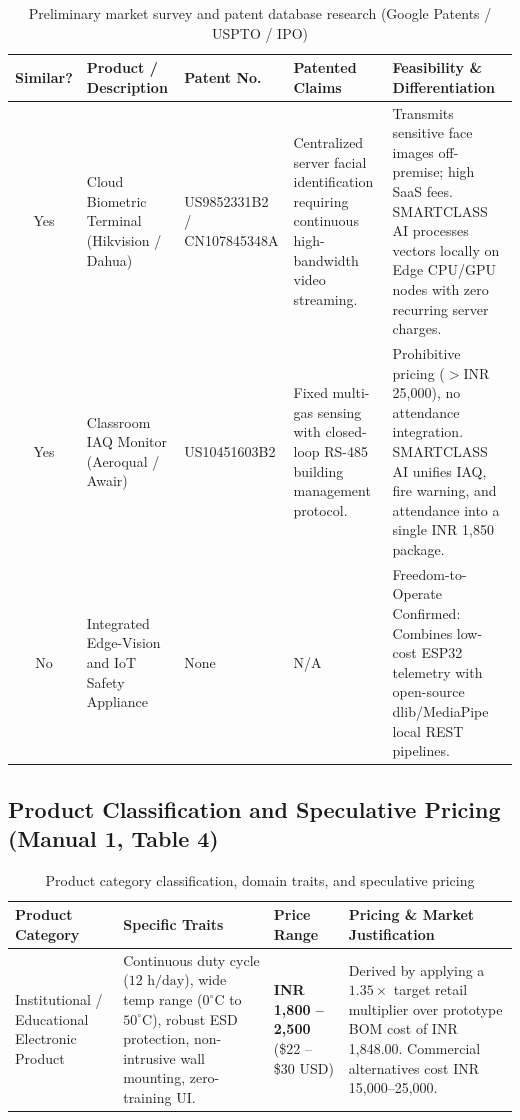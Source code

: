 \documentclass[11pt,a4paper]{article}
\begin{document}
\begin{table}[h!]
\centering
\caption{Preliminary market survey and patent database research (Google Patents / USPTO / IPO)}
\begin{tabular}{|c|p{3.5cm}|p{2.8cm}|p{3.8cm}|p{4.2cm}|}
\hline
\textbf{Similar?} & \textbf{Product / Description} & \textbf{Patent No.} & \textbf{Patented Claims} & \textbf{Feasibility \& Differentiation} \\ \hline
Yes & Cloud Biometric Terminal (Hikvision / Dahua) & US9852331B2 / CN107845348A & Centralized server facial identification requiring continuous high-bandwidth video streaming. & Transmits sensitive face images off-premise; high SaaS fees. SMARTCLASS AI processes vectors locally on Edge CPU/GPU nodes with zero recurring server charges. \\ \hline
Yes & Classroom IAQ Monitor (Aeroqual / Awair) & US10451603B2 & Fixed multi-gas sensing with closed-loop RS-485 building management protocol. & Prohibitive pricing ($>$INR 25,000), no attendance integration. SMARTCLASS AI unifies IAQ, fire warning, and attendance into a single INR 1,850 package. \\ \hline
No & Integrated Edge-Vision and IoT Safety Appliance & None & N/A & Freedom-to-Operate Confirmed: Combines low-cost ESP32 telemetry with open-source dlib/MediaPipe local REST pipelines. \\ \hline
\end{tabular}
\end{table}

\subsection{Product Classification and Speculative Pricing (Manual 1, Table 4)}

\begin{table}[h!]
\centering
\caption{Product category classification, domain traits, and speculative pricing}
\begin{tabular}{|p{3.5cm}|p{4.2cm}|p{3.2cm}|p{4.2cm}|}
\hline
\textbf{Product Category} & \textbf{Specific Traits} & \textbf{Price Range} & \textbf{Pricing \& Market Justification} \\ \hline
Institutional / Educational Electronic Product & Continuous duty cycle ($12\text{ h/day}$), wide temp range ($0^\circ\text{C}$ to $50^\circ\text{C}$), robust ESD protection, non-intrusive wall mounting, zero-training UI. & \textbf{INR 1,800 – 2,500} (\$22 – \$30 USD) & Derived by applying a $1.35\times$ target retail multiplier over prototype BOM cost of INR 1,848.00. Commercial alternatives cost INR 15,000–25,000. \\ \hline
\end{tabular}
\end{table}
\end{document}
